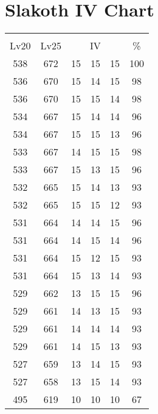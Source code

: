 \documentclass{article}%
\begin{document}
%
\normalsize%
\section{Slakoth IV Chart}%
\label{sec:Slakoth IV Chart}%
\renewcommand{\arraystretch}{1.5}%
\begin{tabular}{|c|c|c|c|c|c|}%
\hline%
\multicolumn{6}{|c|}{\textcolor{white}{ 
\linebreak{Slakoth}
}%
\cellcolor{black}}\\%
\multicolumn{1}{|c}{Lv20}&\multicolumn{1}{c|}{Lv25}&\multicolumn{3}{c|}{IV}&\multicolumn{1}{|c|}{\%}\\%
\hline%
\rowcolor{color100}%
538&672&15&15&15&100\\%
\hline%
\rowcolor{color98}%
536&670&15&14&15&98\\%
\hline%
\rowcolor{color98}%
536&670&15&15&14&98\\%
\hline%
\rowcolor{color96}%
534&667&15&14&14&96\\%
\hline%
\rowcolor{color96}%
534&667&15&15&13&96\\%
\hline%
\rowcolor{color98}%
533&667&14&15&15&98\\%
\hline%
\rowcolor{color96}%
533&667&15&13&15&96\\%
\hline%
\rowcolor{color93}%
532&665&15&14&13&93\\%
\hline%
\rowcolor{color93}%
532&665&15&15&12&93\\%
\hline%
\rowcolor{color96}%
531&664&14&14&15&96\\%
\hline%
\rowcolor{color96}%
531&664&14&15&14&96\\%
\hline%
\rowcolor{color93}%
531&664&15&12&15&93\\%
\hline%
\rowcolor{color93}%
531&664&15&13&14&93\\%
\hline%
\rowcolor{color96}%
529&662&13&15&15&96\\%
\hline%
\rowcolor{color93}%
529&661&14&13&15&93\\%
\hline%
\rowcolor{color93}%
529&661&14&14&14&93\\%
\hline%
\rowcolor{color93}%
529&661&14&15&13&93\\%
\hline%
\rowcolor{color93}%
527&659&13&14&15&93\\%
\hline%
\rowcolor{color93}%
527&658&13&15&14&93\\%
\hline%
\rowcolor{color91}%
495&619&10&10&10&67\\%
\end{tabular}

%
\end{document}

